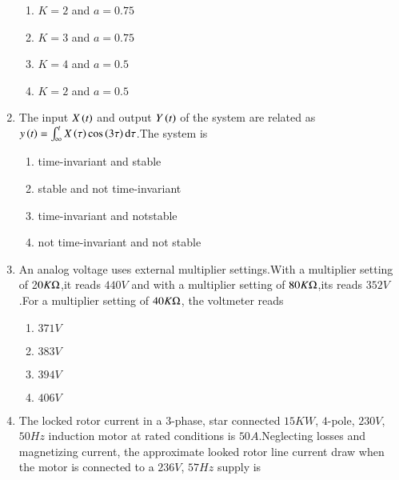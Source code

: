 \documentclass[journal]{IEEEtran}
\begin{document}
\begin{enumerate}
     \begin{enumerate}
         \item$K=2$ and $a=0.75$\\
         \item$K=3$ and $a=0.75$\\
         \item$K=4$ and $a=0.5$\\
         \item$K=2$ and $a=0.5$
          \end{enumerate}
    \item The input $X\left(t\right)$ and output $Y\left(t\right)$ of the system are related as $y\left(t\right)=\int_\infty^tX\left(\tau\right)\cos\left(3\tau\right)\mathrm{d}\tau$.The system is\\
    \begin{enumerate}
        \item time-invariant and stable\\
        \item stable and not time-invariant\\
         \item time-invariant and notstable\\
        \item not time-invariant and not stable
    \end{enumerate}
    \item An analog voltage uses external multiplier settings.With a multiplier setting of 2$0 K\ohm$,it reads $440 V$ and with a multiplier setting of $80 K\ohm$,its reads $352 V$.For a multiplier setting of $40 K\ohm$, the voltmeter reads\\
    \begin{enumerate}
        \item$371 V$\\
        \item$383 V$\\
        \item$394 V$\\
        \item$406 V$
    \end{enumerate}
    \item The locked rotor current in a $3$-phase, star connected $15 KW$, $4$-pole, $230 V$, $50Hz$ induction motor at rated conditions is $50 A$.Neglecting losses and magnetizing current, the approximate looked rotor line  current draw when the motor is connected to a $236 V$, $57 Hz$ supply is\\

\end{enumerate}
\end{document}

